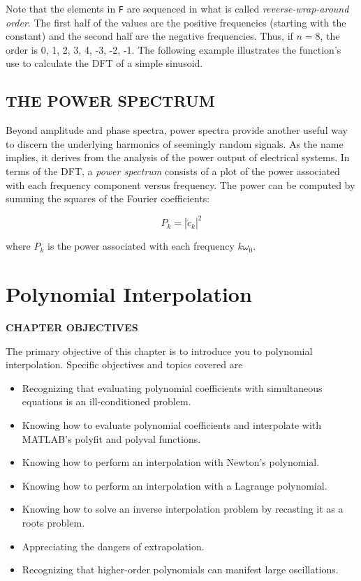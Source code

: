 \documentclass[../main.tex]{subfiles}
\begin{document}
Note that the elements in \texttt{F} are sequenced in what is called \textit{reverse-wrap-around
order}. The first half of the values are the positive frequencies (starting with the constant)
and the second half are the negative frequencies. Thus, if $n = 8$, the order is 0, 1, 2, 3, 4, -3, -2, -1. The following example illustrates the function's use to calculate the DFT of a
simple sinusoid.


\label{cha:cha_P_16_6}
\section{THE POWER SPECTRUM}

\noindent Beyond amplitude and phase spectra, power spectra provide another useful way to discern
the underlying harmonics of seemingly random signals. As the name implies, it derives
from the analysis of the power output of electrical systems. In terms of the DFT, a \textit{power
spectrum} consists of a plot of the power associated with each frequency component versus
frequency. The power can be computed by summing the squares of the Fourier coefficients:

\begin{equation}
	P_k = {|\tilde{c}_k|}^2
\end{equation}

\noindent where $P_k$ is the power associated with each frequency $k \omega_0$.




\label{cha:cha_P_17} %
\chapter{Polynomial Interpolation}
\textbf{CHAPTER OBJECTIVES}

\noindent The primary objective of this chapter is to introduce you to polynomial interpolation.
Specific objectives and topics covered are

\begin{itemize}
	\item Recognizing that evaluating polynomial coefficients with simultaneous equations is an ill-conditioned problem.
	\item  Knowing how to evaluate polynomial coefficients and interpolate with MATLAB's polyfit and polyval functions.
	\item  Knowing how to perform an interpolation with Newton's polynomial.
	\item  Knowing how to perform an interpolation with a Lagrange polynomial.
	\item  Knowing how to solve an inverse interpolation problem by recasting it as a roots problem.
	\item  Appreciating the dangers of extrapolation.
	\item  Recognizing that higher-order polynomials can manifest large oscillations.
\end{itemize}
\end{document}
